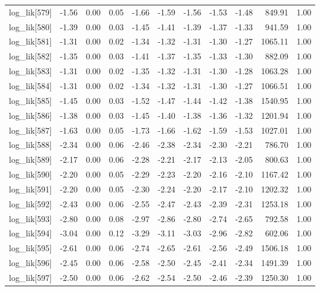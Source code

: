 \begin{table}[ht]
\begin{tabular}{rrrrrrrrrrr}
  log\_lik[579] & -1.56 & 0.00 & 0.05 & -1.66 & -1.59 & -1.56 & -1.53 & -1.48 & 849.91 & 1.00 \\ 
  log\_lik[580] & -1.39 & 0.00 & 0.03 & -1.45 & -1.41 & -1.39 & -1.37 & -1.33 & 941.59 & 1.00 \\ 
  log\_lik[581] & -1.31 & 0.00 & 0.02 & -1.34 & -1.32 & -1.31 & -1.30 & -1.27 & 1065.11 & 1.00 \\ 
  log\_lik[582] & -1.35 & 0.00 & 0.03 & -1.41 & -1.37 & -1.35 & -1.33 & -1.30 & 882.09 & 1.00 \\ 
  log\_lik[583] & -1.31 & 0.00 & 0.02 & -1.35 & -1.32 & -1.31 & -1.30 & -1.28 & 1063.28 & 1.00 \\ 
  log\_lik[584] & -1.31 & 0.00 & 0.02 & -1.34 & -1.32 & -1.31 & -1.30 & -1.27 & 1066.51 & 1.00 \\ 
  log\_lik[585] & -1.45 & 0.00 & 0.03 & -1.52 & -1.47 & -1.44 & -1.42 & -1.38 & 1540.95 & 1.00 \\ 
  log\_lik[586] & -1.38 & 0.00 & 0.03 & -1.45 & -1.40 & -1.38 & -1.36 & -1.32 & 1201.94 & 1.00 \\ 
  log\_lik[587] & -1.63 & 0.00 & 0.05 & -1.73 & -1.66 & -1.62 & -1.59 & -1.53 & 1027.01 & 1.00 \\ 
  log\_lik[588] & -2.34 & 0.00 & 0.06 & -2.46 & -2.38 & -2.34 & -2.30 & -2.21 & 786.70 & 1.00 \\ 
  log\_lik[589] & -2.17 & 0.00 & 0.06 & -2.28 & -2.21 & -2.17 & -2.13 & -2.05 & 800.63 & 1.00 \\ 
  log\_lik[590] & -2.20 & 0.00 & 0.05 & -2.29 & -2.23 & -2.20 & -2.16 & -2.10 & 1167.42 & 1.00 \\ 
  log\_lik[591] & -2.20 & 0.00 & 0.05 & -2.30 & -2.24 & -2.20 & -2.17 & -2.10 & 1202.32 & 1.00 \\ 
  log\_lik[592] & -2.43 & 0.00 & 0.06 & -2.55 & -2.47 & -2.43 & -2.39 & -2.31 & 1253.18 & 1.00 \\ 
  log\_lik[593] & -2.80 & 0.00 & 0.08 & -2.97 & -2.86 & -2.80 & -2.74 & -2.65 & 792.58 & 1.00 \\ 
  log\_lik[594] & -3.04 & 0.00 & 0.12 & -3.29 & -3.11 & -3.03 & -2.96 & -2.82 & 602.06 & 1.00 \\ 
  log\_lik[595] & -2.61 & 0.00 & 0.06 & -2.74 & -2.65 & -2.61 & -2.56 & -2.49 & 1506.18 & 1.00 \\ 
  log\_lik[596] & -2.45 & 0.00 & 0.06 & -2.58 & -2.50 & -2.45 & -2.41 & -2.34 & 1491.39 & 1.00 \\ 
  log\_lik[597] & -2.50 & 0.00 & 0.06 & -2.62 & -2.54 & -2.50 & -2.46 & -2.39 & 1250.30 & 1.00 \\ 

\end{tabular}
\end{table}

